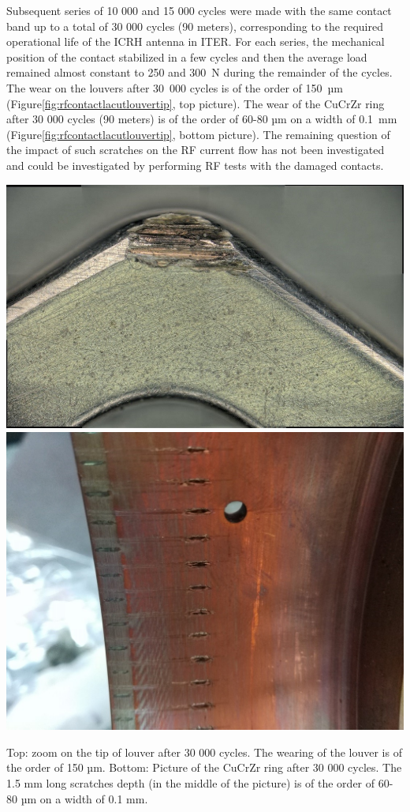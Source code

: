{Subsequent series of 10 000 and 15 000 cycles were made with the same contact band up to a total of 30 000 cycles (90 meters), corresponding to the required operational life of the ICRH antenna in ITER. For each series, the mechanical position of the contact stabilized in a few cycles and then the average load remained almost constant to 250 and 300~N during the remainder of the cycles. The wear on the louvers after 30~000 cycles is of the order of 150~µm (Figure\ref{fig:rfcontactlacutlouvertip}, top picture). The wear of the CuCrZr ring after 30 000 cycles (90 meters) is of the order of 60-80 µm on a width of 0.1~mm (Figure\ref{fig:rfcontactlacutlouvertip}, bottom picture). The remaining question of the impact of such scratches on the RF current flow has not been investigated and could be investigated by performing RF tests with the damaged contacts.


\begin{marginfigure}[-4cm]
	\centering
	\includegraphics[width=1.0\linewidth]{figures/chap3/RF_contacts/RF_contact_LACUT_louvertip}\\
	\includegraphics[width=1.0\linewidth]{figures/chap3/RF_contacts/RF_contact_LACUT_scratches}
	\caption{Top: zoom on the tip of louver after 30 000 cycles. The wearing of the louver is of the order of 150 µm. Bottom: Picture of the CuCrZr ring after 30 000 cycles. The 1.5 mm long scratches depth (in the middle of the picture) is of the order of 60-80 µm on a width of 0.1 mm.}
	\label{fig:rfcontactlacutlouvertip}
\end{marginfigure}


}
